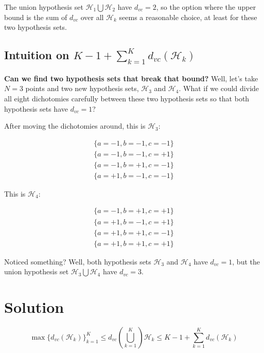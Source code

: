 \documentclass{article}
\begin{document}
The union hypothesis set $\mathcal{H}_1\bigcup\mathcal{H}_2$ have $d_{vc}=2$,
so the option where the upper bound is the sum of $d_{vc}$ over all
$\mathcal{H}_k$ seems a reasonable choice, at least for these two hypothesis
sets.

\subsection{Intuition on $K-1+\sum_{k=1}^Kd_{vc}(\mathcal{H}_k)$}

\textbf{Can we find two hypothesis sets that break that bound?} Well, let's
take $N=3$ points and two new hypothesis sets,
$\mathcal{H}_3$ and $\mathcal{H}_4$. What if we could divide all eight
dichotomies carefully between these two hypothesis sets so that both
hypothesis sets have $d_{vc}=1$?

After moving the dichotomies around, this is $\mathcal{H}_3$:

\begin{equation*}
\begin{split}
\{a=-1, b=-1, c=-1\} \\
\{a=-1, b=-1, c=+1\} \\
\{a=-1, b=+1, c=-1\} \\
\{a=+1, b=-1, c=-1\}
\end{split}
\end{equation*}

This is $\mathcal{H}_4$:

\begin{equation*}
\begin{split}
\{a=-1, b=+1, c=+1\} \\
\{a=+1, b=-1, c=+1\} \\
\{a=+1, b=+1, c=-1\} \\
\{a=+1, b=+1, c=+1\}
\end{split}
\end{equation*}

Noticed something? Well, both hypothesis sets $\mathcal{H}_3$ and
$\mathcal{H}_4$ have $d_{vc}=1$, but the union hypothesis set
$\mathcal{H}_3\bigcup\mathcal{H}_4$ have $d_{vc}=3$.

\section{Solution}

$$
\max\{d_{vc}(\mathcal{H}_k)\}_{k=1}^K \leq d_{vc}(\bigcup _{k=1}^K)\mathcal{H}_k \leq K-1+\sum_{k=1}^Kd_{vc}(\mathcal{H}_k)
$$
\end{document}
